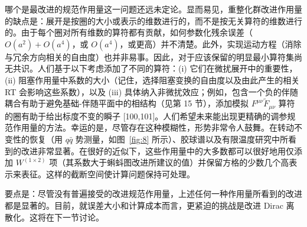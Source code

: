 哪个是最改进的规范作用量这一问题还远未定论。显而易见，重整化群改进作用量的缺点是：展开是按圈的大小或表示的维数进行的，而不是按无关算符的维数进行的。由于每个圈对所有维数的算符都有贡献，如何参数化残余误差（$O(a^2) + O(a^4)$，或 $O(a^4)$，或更高）并不清楚。此外，实现运动方程（消除与冗余方向相关的自由度）也并非易事。因此，对于应该保留的明显最小算符集尚无共识。人们基于以下考虑添加了不同的算符：(i) 它们在微扰展开中的重要性，(ii) 阻塞作用量中系数的大小（记住，选择阻塞变换的自由度以及由此产生的相关 RT 会影响这些系数），以及 (iii) 具体纳入非微扰效应；例如，包含一个负的伴随耦合有助于避免基础-伴随平面中的相结构（见第 15 节），添加模拟 $F^{\mu\nu}\tilde F_{\mu\nu}$ 算符的圈有助于给出标度不变的瞬子 [100,101]。人们希望未来能出现更精确的调参规范作用量的方法。幸运的是，尽管存在这种模糊性，形势非常令人鼓舞。在转动不变性的恢复（用 $q\bar
q$ 势测量，如图~\ref{fig:8} 所示）、胶球谱以及有限温度研究中所看到的改进非常显著。在很好的近似下，这些作用量中的大多数都可以很好地用仅添加 $W^{(1\times2)}$ 项（其系数大于蝌蚪图改进所建议的值）并保留方格的少数几个高表示来表征。这样的截断空间使计算问题保持可处理。

要点是：尽管没有普遍接受的改进规范作用量，上述任何一种作用量所看到的改进都是显著的。目前，就误差大小和计算成本而言，更紧迫的挑战是改进 Dirac 离散化。这将在下一节讨论。
